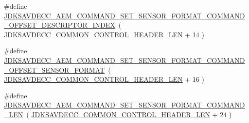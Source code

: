 \begin{DoxyCompactItemize}
\item 
\#define \hyperlink{group__command__set__sensor__format_ga6ecab266ea9cb7a12d578502ad898970}{J\+D\+K\+S\+A\+V\+D\+E\+C\+C\+\_\+\+A\+E\+M\+\_\+\+C\+O\+M\+M\+A\+N\+D\+\_\+\+S\+E\+T\+\_\+\+S\+E\+N\+S\+O\+R\+\_\+\+F\+O\+R\+M\+A\+T\+\_\+\+C\+O\+M\+M\+A\+N\+D\+\_\+\+O\+F\+F\+S\+E\+T\+\_\+\+D\+E\+S\+C\+R\+I\+P\+T\+O\+R\+\_\+\+I\+N\+D\+EX}~( \hyperlink{group__jdksavdecc__avtp__common__control__header_gaae84052886fb1bb42f3bc5f85b741dff}{J\+D\+K\+S\+A\+V\+D\+E\+C\+C\+\_\+\+C\+O\+M\+M\+O\+N\+\_\+\+C\+O\+N\+T\+R\+O\+L\+\_\+\+H\+E\+A\+D\+E\+R\+\_\+\+L\+EN} + 14 )
\item 
\#define \hyperlink{group__command__set__sensor__format_ga9657e5db1c202aee1f52ffb3981facf7}{J\+D\+K\+S\+A\+V\+D\+E\+C\+C\+\_\+\+A\+E\+M\+\_\+\+C\+O\+M\+M\+A\+N\+D\+\_\+\+S\+E\+T\+\_\+\+S\+E\+N\+S\+O\+R\+\_\+\+F\+O\+R\+M\+A\+T\+\_\+\+C\+O\+M\+M\+A\+N\+D\+\_\+\+O\+F\+F\+S\+E\+T\+\_\+\+S\+E\+N\+S\+O\+R\+\_\+\+F\+O\+R\+M\+AT}~( \hyperlink{group__jdksavdecc__avtp__common__control__header_gaae84052886fb1bb42f3bc5f85b741dff}{J\+D\+K\+S\+A\+V\+D\+E\+C\+C\+\_\+\+C\+O\+M\+M\+O\+N\+\_\+\+C\+O\+N\+T\+R\+O\+L\+\_\+\+H\+E\+A\+D\+E\+R\+\_\+\+L\+EN} + 16 )
\item 
\#define \hyperlink{group__command__set__sensor__format_ga4711626a8fef327b70b754d819c10125}{J\+D\+K\+S\+A\+V\+D\+E\+C\+C\+\_\+\+A\+E\+M\+\_\+\+C\+O\+M\+M\+A\+N\+D\+\_\+\+S\+E\+T\+\_\+\+S\+E\+N\+S\+O\+R\+\_\+\+F\+O\+R\+M\+A\+T\+\_\+\+C\+O\+M\+M\+A\+N\+D\+\_\+\+L\+EN}~( \hyperlink{group__jdksavdecc__avtp__common__control__header_gaae84052886fb1bb42f3bc5f85b741dff}{J\+D\+K\+S\+A\+V\+D\+E\+C\+C\+\_\+\+C\+O\+M\+M\+O\+N\+\_\+\+C\+O\+N\+T\+R\+O\+L\+\_\+\+H\+E\+A\+D\+E\+R\+\_\+\+L\+EN} + 24 )
\end{DoxyCompactItemize}
